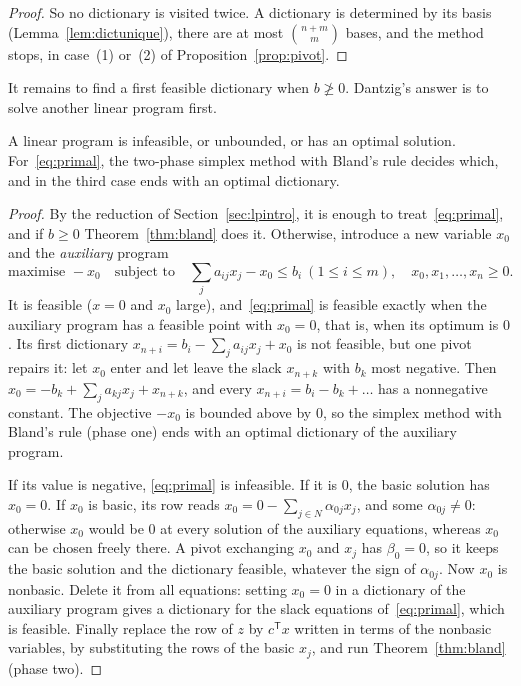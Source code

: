 \begin{proof}
So no dictionary is visited twice. A dictionary is determined by its basis (Lemma~\ref{lem:dictunique}), there are at most $\binom{n+m}{m}$ bases, and the method stops, in case~(1) or~(2) of Proposition~\ref{prop:pivot}.
\end{proof}

It remains to find a first feasible dictionary when $b\not\ge0$. Dantzig's answer is to solve another linear program first.

\begin{theorem}\label{thm:fundamental}
A linear program is infeasible, or unbounded, or has an optimal solution. For~\eqref{eq:primal}, the two-phase simplex method with Bland's rule decides which, and in the third case ends with an optimal dictionary.
\end{theorem}
\begin{proof}
By the reduction of Section~\ref{sec:lpintro}, it is enough to treat~\eqref{eq:primal}, and if $b\ge0$ Theorem~\ref{thm:bland} does it. Otherwise, introduce a new variable $x_0$ and the \emph{auxiliary} program
\[
\text{maximise } -x_0\quad\text{subject to}\quad \sum_ja_{ij}x_j-x_0\le b_i\ (1\le i\le m),\quad x_0,x_1,\dots,x_n\ge0.
\]
It is feasible ($x=0$ and $x_0$ large), and~\eqref{eq:primal} is feasible exactly when the auxiliary program has a feasible point with $x_0=0$, that is, when its optimum is $0$. Its first dictionary
$x_{n+i}=b_i-\sum_ja_{ij}x_j+x_0$ is not feasible, but one pivot repairs it: let $x_0$ enter and let leave the slack $x_{n+k}$ with $b_k$ most negative. Then $x_0=-b_k+\sum_ja_{kj}x_j+x_{n+k}$, and every
$x_{n+i}=b_i-b_k+\dots$ has a nonnegative constant. The objective $-x_0$ is bounded above by $0$, so the simplex method with Bland's rule (phase one) ends with an optimal dictionary of the auxiliary program.

If its value is negative, \eqref{eq:primal} is infeasible. If it is $0$, the basic solution has $x_0=0$. If $x_0$ is basic, its row reads $x_0=0-\sum_{j\in N}\alpha_{0j}x_j$, and some $\alpha_{0j}\ne0$: otherwise $x_0$ would be $0$ at every
solution of the auxiliary equations, whereas $x_0$ can be chosen freely there. A pivot exchanging $x_0$ and $x_j$ has $\beta_0=0$, so it keeps the basic solution and the dictionary feasible, whatever the sign of $\alpha_{0j}$. Now $x_0$ is nonbasic. Delete it from all
equations: setting $x_0=0$ in a dictionary of the auxiliary program gives a dictionary for the slack equations of~\eqref{eq:primal}, which is feasible. Finally replace the row of $z$ by $c^{\mathsf T}x$ written in terms of the nonbasic
variables, by substituting the rows of the basic $x_j$, and run Theorem~\ref{thm:bland} (phase two).
\end{proof}

